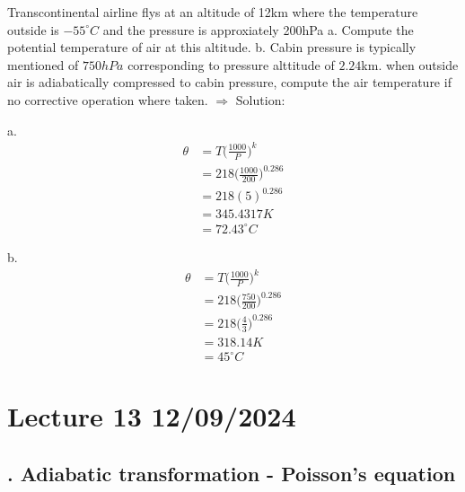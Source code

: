 \documentclass[fleqn,10pt]{SelfArx} %
\begin{document}
\begin{question}[q:12.1]{Transcontinental airline flys at an altitude of 12km where the temperature outside is $-55^{\circ}C$ and the pressure is approxiately 200hPa \newline
    a. Compute the potential temperature of air at this altitude. \newline
    b. Cabin pressure is typically mentioned of $750 hPa$ corresponding to pressure alttitude of $2.24$km. when outside air is adiabatically compressed to cabin pressure, compute the air temperature if no corrective operation where taken.
}
$\Rightarrow$ Solution:

a. \begin{align*}
    \theta &= T \Big(\frac{1000}{P}\Big)^k \\ 
           &= 218 \Big(\frac{1000}{200}\Big)^{0.286}\\ 
           &= 218 (5)^{0.286}\\ 
           &= 345.4317 K \\
           &= 72.43 ^\circ C
\end{align*}

b. \begin{align*}
    \theta &= T \Big(\frac{1000}{P}\Big)^k \\ 
           &= 218 \Big(\frac{750}{200}\Big)^{0.286}\\ 
           &= 218 \Big(\frac{4}{3}\Big)^{0.286}\\ 
           &= 318.14 K \\
           &= 45 ^\circ C
\end{align*}
\end{question}

\clearpage

\section{Lecture 13 12/09/2024}
\subsection{. Adiabatic transformation - Poisson's equation}
\end{document}
